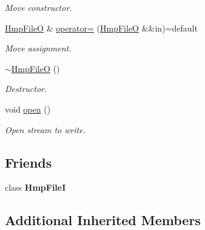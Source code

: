 \begin{DoxyCompactItemize}
\begin{DoxyCompactList}\small\item\em Move constructor. \end{DoxyCompactList}\item 
\mbox{\label{classsamp_files_1_1_hmp_file_o_a02160aa511bfbace0f6fdc5074eb2ac6}} 
\hyperlink{classsamp_files_1_1_hmp_file_o}{Hmp\+FileO} \& \hyperlink{classsamp_files_1_1_hmp_file_o_a02160aa511bfbace0f6fdc5074eb2ac6}{operator=} (\hyperlink{classsamp_files_1_1_hmp_file_o}{Hmp\+FileO} \&\&in)=default
\begin{DoxyCompactList}\small\item\em Move assignment. \end{DoxyCompactList}\item 
\mbox{\label{classsamp_files_1_1_hmp_file_o_a54b7bd87bd30499b2e60b360a12bc4e2}} 
\hyperlink{classsamp_files_1_1_hmp_file_o_a54b7bd87bd30499b2e60b360a12bc4e2}{$\sim$\+Hmp\+FileO} ()
\begin{DoxyCompactList}\small\item\em Destructor. \end{DoxyCompactList}\item 
\mbox{\label{classsamp_files_1_1_hmp_file_o_a0d49862be8b4065b99e2795a91fb01b6}} 
void \hyperlink{classsamp_files_1_1_hmp_file_o_a0d49862be8b4065b99e2795a91fb01b6}{open} ()
\begin{DoxyCompactList}\small\item\em Open stream to write. \end{DoxyCompactList}\end{DoxyCompactItemize}
\subsection*{Friends}
\begin{DoxyCompactItemize}
\item 
\mbox{\label{classsamp_files_1_1_hmp_file_o_a1562cc41c56f46e4090775304e4cdfcd}} 
class {\bfseries Hmp\+FileI}
\end{DoxyCompactItemize}
\subsection*{Additional Inherited Members}


